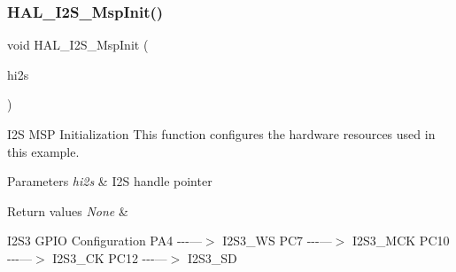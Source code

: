 \subsubsection{\texorpdfstring{H\+A\+L\+\_\+\+I2\+S\+\_\+\+Msp\+Init()}{HAL\_I2S\_MspInit()}}
{\footnotesize\ttfamily void H\+A\+L\+\_\+\+I2\+S\+\_\+\+Msp\+Init (\begin{DoxyParamCaption}\item[{\hyperlink{group___i2_s___exported___types_ga859f888192a094b456619601937580f5}{I2\+S\+\_\+\+Handle\+Type\+Def} $\ast$}]{hi2s }\end{DoxyParamCaption})}



I2S M\+SP Initialization This function configures the hardware resources used in this example. 


\begin{DoxyParams}{Parameters}
{\em hi2s} & I2S handle pointer \\
\hline
\end{DoxyParams}

\begin{DoxyRetVals}{Return values}
{\em None} & \\
\hline
\end{DoxyRetVals}
I2\+S3 G\+P\+IO Configuration P\+A4 -\/-\/-\/---$>$ I2\+S3\+\_\+\+WS P\+C7 -\/-\/-\/---$>$ I2\+S3\+\_\+\+M\+CK P\+C10 -\/-\/-\/---$>$ I2\+S3\+\_\+\+CK P\+C12 -\/-\/-\/---$>$ I2\+S3\+\_\+\+SD